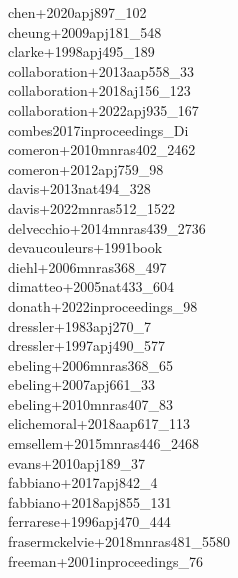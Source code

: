 \documentclass{article}
\begin{document}
\noindent chen+2020apj897_102 \color{black} \\
\noindent cheung+2009apj181_548 \color{black} \\
\noindent clarke+1998apj495_189 \color{black} \\
\noindent collaboration+2013aap558_33 \color{black} \\
\noindent collaboration+2018aj156_123 \color{black} \\
\noindent collaboration+2022apj935_167 \color{black} \\
\noindent combes2017inproceedings_Di \color{black} \\
\noindent comeron+2010mnras402_2462 \color{black} \\
\noindent comeron+2012apj759_98 \color{black} \\
\noindent davis+2013nat494_328 \color{black} \\
\noindent davis+2022mnras512_1522 \color{black} \\
\noindent delvecchio+2014mnras439_2736 \color{black} \\
\noindent devaucouleurs+1991book \color{black} \\
\noindent diehl+2006mnras368_497 \color{black} \\
\noindent dimatteo+2005nat433_604 \color{black} \\
\noindent donath+2022inproceedings_98 \color{black} \\
\noindent dressler+1983apj270_7 \color{black} \\
\noindent dressler+1997apj490_577 \color{black} \\
\noindent ebeling+2006mnras368_65 \color{black} \\
\noindent ebeling+2007apj661_33 \color{black} \\
\noindent ebeling+2010mnras407_83 \color{black} \\
\noindent elichemoral+2018aap617_113 \color{black} \\
\noindent emsellem+2015mnras446_2468 \color{black} \\
\noindent evans+2010apj189_37 \color{black} \\
\noindent fabbiano+2017apj842_4 \color{black} \\
\noindent fabbiano+2018apj855_131 \color{black} \\
\noindent ferrarese+1996apj470_444 \color{black} \\
\noindent frasermckelvie+2018mnras481_5580 \color{black} \\
\noindent freeman+2001inproceedings_76 \color{black} \\
\end{document}

